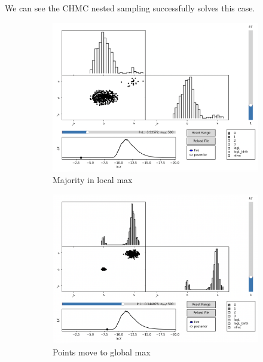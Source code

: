 \documentclass[11pt]{article}
\begin{document}
    We can see the CHMC nested sampling successfully solves this case.
    \begin{figure}[H]
        \centering
        \begin{subfigure}[b]{0.3\linewidth}
            \centering
            \includegraphics[width=\linewidth]{../figures/topotrap/NS1}
            \caption{Majority in local max}
        \end{subfigure}
        \begin{subfigure}[b]{0.3\linewidth}
            \centering
            \includegraphics[width=\linewidth]{../figures/topotrap/NS2}
            \caption{Points move to global max}
        \end{subfigure}
        \begin{subfigure}[b]{0.3\linewidth}

\end{subfigure}
\end{figure}
\end{document}
